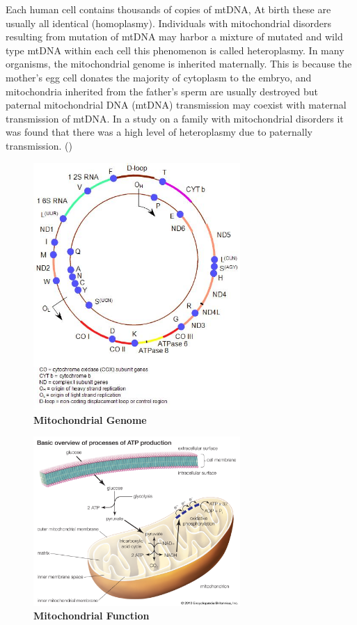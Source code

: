Each human cell contains thousands of copies of mtDNA, At birth these are usually all identical (homoplasmy).
Individuals with mitochondrial disorders resulting from mutation of mtDNA may harbor a mixture of mutated and wild type mtDNA within each cell this phenomenon is called heteroplasmy. 
In many organisms, the mitochondrial genome is inherited maternally. This is because the mother’s egg cell donates the majority of cytoplasm to the embryo, and mitochondria inherited from the father’s sperm are usually destroyed but paternal mitochondrial DNA (mtDNA) transmission may coexist with maternal transmission of mtDNA. In a study on a family with mitochondrial disorders it was found that there was a high level of heteroplasmy due to paternally transmission.
  (\cite{luo2018biparental})

\begin{figure}[H]
\centering
\includegraphics[width=0.7\textwidth]{Fig/mitogenome.jpg}
\decoRule
\caption{\textbf{Mitochondrial Genome}}
\label{fig:Mitochondrial Genome}
\end{figure}

\begin{figure}[H]
\centering
\includegraphics[width=0.7\textwidth]{Fig/processes-production-ATP-glycolysis-tricarboxylic-acid-cycle.jpg}
\decoRule
\caption{\textbf{Mitochondrial Function}}
\label{fig:Mitochondrial Function}
\end{figure}


